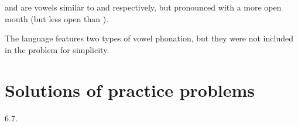 \begin{refsection}
\begin{problem}{\langnameDinka}{\nameMLaznicka}{}
\begin{tblsWarning}
 and  are vowels similar to  and  respectively, but pronounced with a more open mouth (but less open than ). 

The language features two types of vowel phonation, but they were not included in the problem for simplicity.
\end{tblsWarning}
\end{problem}

\hypertarget{solutions-of-practice-problems}{%
\section{Solutions of practice problems}}

\begin{practiceproblemsolution}{6.7. \langnameSwahili}


\end{practiceproblemsolution}
\end{refsection}
